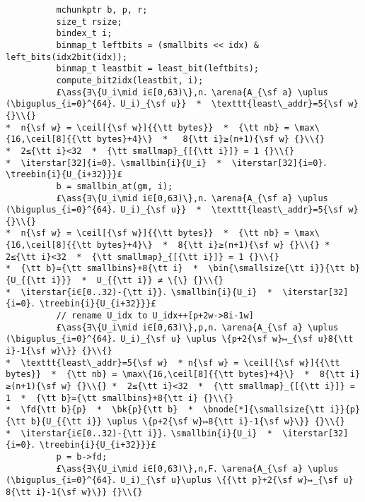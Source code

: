 \documentclass[10pt,a4paper,twoside]{report}
\makeatletter
\newcommand{\ml}[2][t]{\mbox{\mdseries\begin{tabular}[#1]{@{}L@{}}#2\end{tabular}}}
\newcommand{\ass}[1]{\ensuremath{{\color{blue}\left\{\ml[c]{#1}\right\}}}}
\renewcommand{\ceil}[2][]{\left\lceil{#2}\right\rceil_{#1}}
\newcommand{\iterstar}[2][]{\text{\LARGE $*$}^{#1}_{#2}}
\makeatother
\begin{document}
\begin{lstlisting}
          mchunkptr b, p, r;
          size_t rsize;
          bindex_t i;
          binmap_t leftbits = (smallbits << idx) & left_bits(idx2bit(idx));
          binmap_t leastbit = least_bit(leftbits);
          compute_bit2idx(leastbit, i);
          £\ass{∃\{U_i\mid i∈[0,63)\},n．\arena{A_{\sf a} \uplus (\biguplus_{i=0}^{64}．U_i)_{\sf u}}  *  \texttt{least\_addr}=5{\sf w} {}\\{}
*  n{\sf w} = \ceil[{\sf w}]{{\tt bytes}}  *  {\tt nb} = \max\{16,\ceil[8]{{\tt bytes}+4}\}  *   8{\tt i}≥(n+1){\sf w} {}\\{}
*  2≤{\tt i}<32  *  {\tt smallmap}_{[{\tt i}]} = 1 {}\\{}
*  \iterstar[32]{i=0}．\smallbin{i}{U_i}  *  \iterstar[32]{i=0}．\treebin{i}{U_{i+32}}}£
          b = smallbin_at(gm, i);
          £\ass{∃\{U_i\mid i∈[0,63)\},n．\arena{A_{\sf a} \uplus (\biguplus_{i=0}^{64}．U_i)_{\sf u}}  *  \texttt{least\_addr}=5{\sf w} {}\\{}
*  n{\sf w} = \ceil[{\sf w}]{{\tt bytes}}  *  {\tt nb} = \max\{16,\ceil[8]{{\tt bytes}+4}\}  *  8{\tt i}≥(n+1){\sf w} {}\\{} *  2≤{\tt i}<32  *  {\tt smallmap}_{[{\tt i}]} = 1 {}\\{}
*  {\tt b}={\tt smallbins}+8{\tt i}  *  \bin{\smallsize{\tt i}}{\tt b}{U_{{\tt i}}}  *  U_{{\tt i}} ≠ \{\} {}\\{}
*  \iterstar{i∈[0..32)-{\tt i}}．\smallbin{i}{U_i}  *  \iterstar[32]{i=0}．\treebin{i}{U_{i+32}}}£
          // rename U_idx to U_idx++[p+2w->8i-1w]
          £\ass{∃\{U_i\mid i∈[0,63)\},p,n．\arena{A_{\sf a} \uplus (\biguplus_{i=0}^{64}．U_i)_{\sf u} \uplus \{p+2{\sf w}↦_{\sf u}8{\tt i}-1{\sf w}\}} {}\\{}
*  \texttt{least\_addr}=5{\sf w}  * n{\sf w} = \ceil[{\sf w}]{{\tt bytes}}  *  {\tt nb} = \max\{16,\ceil[8]{{\tt bytes}+4}\}  *  8{\tt i}≥(n+1){\sf w} {}\\{} *  2≤{\tt i}<32  *  {\tt smallmap}_{[{\tt i}]} = 1  *  {\tt b}={\tt smallbins}+8{\tt i} {}\\{}
*  \fd{\tt b}{p}  *  \bk{p}{\tt b}  *  \bnode[*]{\smallsize{\tt i}}{p}{\tt b}{U_{{\tt i}} \uplus \{p+2{\sf w}↦8{\tt i}-1{\sf w}\}} {}\\{}
*  \iterstar{i∈[0..32)-{\tt i}}．\smallbin{i}{U_i}  *  \iterstar[32]{i=0}．\treebin{i}{U_{i+32}}}£
          p = b->fd;
          £\ass{∃\{U_i\mid i∈[0,63)\},n,F．\arena{A_{\sf a} \uplus (\biguplus_{i=0}^{64}．U_i)_{\sf u}\uplus \{{\tt p}+2{\sf w}↦_{\sf u} 8{\tt i}-1{\sf w}\}} {}\\{} 

\end{lstlisting}
\end{document}
